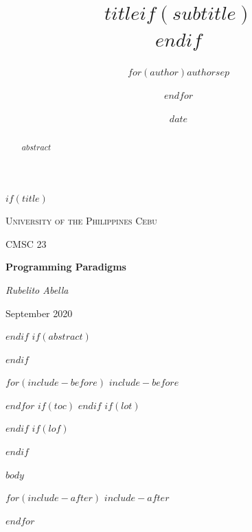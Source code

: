 \documentclass[$if(fontsize)$$fontsize$,$endif$$if(lang)$$lang$,$endif$$if(papersize)$$papersize$,$endif$$for(classoption)$$classoption$$sep$,$endfor$]{$documentclass$}
\title{$title$$if(subtitle)$\\\vspace{0.5em}{\large $subtitle$}$endif$}
\author{$for(author)$$author$$sep$ \and $endfor$}
\date{$date$}
\begin{document}
$if(title)$
\begin{titlepage}
	\centering
	{\scshape\LARGE University of the Philippines Cebu \par}
	\vspace{1cm}
	{\scshape\Large CMSC 23\par}
	\vspace{1.5cm}
	{\huge\bfseries Programming Paradigms\par}
	\vspace{2cm}
	{\Large\itshape Rubelito Abella\par}
	\vfill

	\vfill

	{\large September 2020\par}
\end{titlepage}
$endif$
$if(abstract)$
\begin{abstract}
$abstract$
\end{abstract}
$endif$

$for(include-before)$
$include-before$

$endfor$
$if(toc)$
{
\hypersetup{linkcolor=black}
\setcounter{tocdepth}{$toc-depth$}
\tableofcontents
}
$endif$
$if(lot)$
\listoftables
$endif$
$if(lof)$
\listoffigures
$endif$

$body$


\printbibliography

$for(include-after)$
$include-after$

$endfor$
\end{document}
